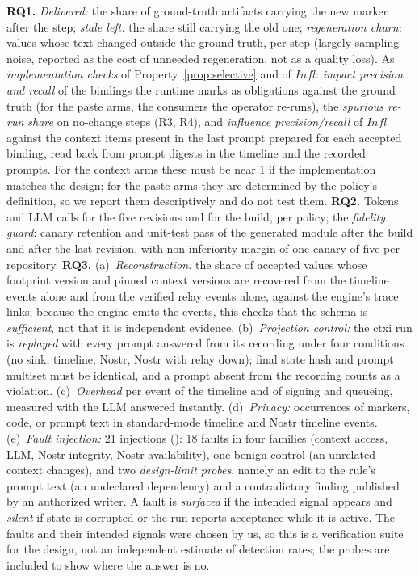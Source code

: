 \documentclass[10pt,conference]{IEEEtran}
\theoremstyle{definition}
\newcommand{\Infl}{\mathit{Infl}}
\begin{document}
\textbf{RQ1.} \emph{Delivered:} the share of ground-truth artifacts carrying the new marker after the
step; \emph{stale left:} the share still carrying the old one; \emph{regeneration churn:} values whose
text changed outside the ground truth, per step (largely sampling noise, reported as the cost of
unneeded regeneration, not as a quality loss). As \emph{implementation checks} of
Property~\ref{prop:selective} and of $\Infl$: \emph{impact precision and recall} of the bindings the
runtime marks as obligations against the ground truth (for the paste arms, the consumers the operator
re-runs), the \emph{spurious re-run share} on no-change steps (R3, R4), and \emph{influence
precision/recall} of $\Infl$ against the context items present in the last prompt prepared for each
accepted binding, read back from prompt digests in the timeline and the recorded prompts. For the context
arms these must be near 1 if the implementation matches the design; for the paste arms they are determined
by the policy's definition, so we report them descriptively and do not test them.
\textbf{RQ2.} Tokens and LLM calls for the five revisions and for the build, per policy; the
\emph{fidelity guard}: canary retention and unit-test pass of the generated module after the build and after
the last revision, with non-inferiority margin of one canary of five per repository.
\textbf{RQ3.} (a)~\emph{Reconstruction:} the share of accepted values whose footprint version and pinned
context versions are recovered from the timeline events alone and from the verified relay events alone,
against the engine's trace links; because the engine emits the events, this checks that the schema is
\emph{sufficient}, not that it is independent evidence. (b)~\emph{Projection control:} the ctxi run is
\emph{replayed} with every prompt answered from its recording under four conditions (no sink, timeline,
Nostr, Nostr with relay down); final state hash and prompt multiset must be identical, and a prompt absent
from the recording counts as a violation. (c)~\emph{Overhead} per event of the timeline and of signing and
queueing, measured with the LLM answered instantly. (d)~\emph{Privacy:} occurrences of markers, code, or
prompt text in standard-mode timeline and Nostr timeline events. (e)~\emph{Fault injection:} 21 injections
(): 18 faults in four families (context access, LLM, Nostr integrity, Nostr availability),
one benign control (an unrelated context changes), and two \emph{design-limit probes}, namely an edit to the
rule's prompt text (an undeclared dependency) and a contradictory finding published by an authorized
writer. A fault is \emph{surfaced} if the intended signal appears and \emph{silent} if state is corrupted or
the run reports acceptance while it is active. The faults and their intended signals were chosen by us, so
this is a verification suite for the design, not an independent estimate of detection rates; the probes are
included to show where the answer is no.
\end{document}
